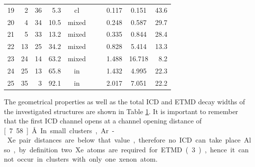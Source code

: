 \begin{table}[h]
\begin{tabular}{rrrrcccccr}
                                                                                                 \midrule
19 &     2 &    36 &  5.3  & cl    &         &          & 0.117 & 0.151 &  43.6\\                        %
20 &     4 &    34 & 10.5  & mixed &         &          & 0.248 & 0.587 &  29.7\\                        %
21 &     5 &    33 & 13.2  & mixed &         &          & 0.335 & 0.844 &  28.4\\                        %
22 &    13 &    25 & 34.2  & mixed &         &          & 0.828 & 5.414 &  13.3\\                        %
23 &    24 &    14 & 63.2  & mixed &         &          & 1.488 &16.718 &   8.2\\                        %
24 &    25 &    13 & 65.8  & in    &         &          & 1.432 & 4.995 &  22.3\\                        %
25 &    35 &     3 & 92.1  & in    &         &          & 2.017 & 7.051 &  22.2\\                        %
\bottomrule
\end{tabular}
\label{table:theo_gammas}
\end{table}
%
The geometrical properties as well as the total ICD and ETMD decay widths
of the investigated structures are shown in Table \ref{table:theo_gammas}.
It is important to remember that the first ICD channel opens at a
channel opening distance of \unit[7.58]{\AA}. In small
clusters, Ar-Xe pair distances are below that value, therefore 
no ICD can take place. Also, by definition two Xe atoms are
required for ETMD(3), hence it cannot occur in clusters with only one xenon atom.
%
